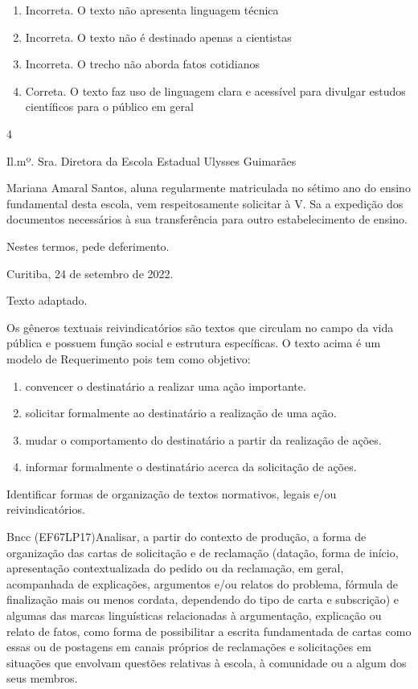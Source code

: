 {{\begin{itemize}
\begin{itemize}
\begin{enumerate}
\def\labelenumi{\arabic{enumi}.}
\item
  Incorreta. O texto não apresenta linguagem técnica
\item
  Incorreta. O texto não é destinado apenas a cientistas
\item
  Incorreta. O trecho não aborda fatos cotidianos
\item
  Correta. O texto faz uso de linguagem clara e acessível para divulgar
  estudos científicos para o público em geral
\end{enumerate}

\num{4}

Il.mº. Sra. Diretora da Escola Estadual Ulysses Guimarães

Mariana Amaral Santos, aluna regularmente matriculada no sétimo ano do
ensino fundamental desta escola, vem respeitosamente solicitar à V. Sa a
expedição dos documentos necessários à sua transferência para outro
estabelecimento de ensino.

Nestes termos, pede deferimento.

Curitiba, 24 de setembro de 2022.

Texto adaptado.

Os gêneros textuais reivindicatórios são textos que circulam no campo da
vida pública e possuem função social e estrutura específicas. O texto
acima é um modelo de Requerimento pois tem como objetivo:

\begin{enumerate}
\def\labelenumi{\arabic{enumi}.}
\item
  convencer o destinatário a realizar uma ação importante.
\item
  solicitar formalmente ao destinatário a realização de uma ação.
\item
  mudar o comportamento do destinatário a partir da realização de ações.
\item
  informar formalmente o destinatário acerca da solicitação de ações.
\end{enumerate}

Identificar formas de organização de textos normativos, legais e/ou
reivindicatórios.

Bncc (EF67LP17)Analisar, a partir do contexto de produção, a forma de
organização das cartas de solicitação e de reclamação (datação, forma de
início, apresentação contextualizada do pedido ou da reclamação, em
geral, acompanhada de explicações, argumentos e/ou relatos do problema,
fórmula de finalização mais ou menos cordata, dependendo do tipo de
carta e subscrição) e algumas das marcas linguísticas relacionadas à
argumentação, explicação ou relato de fatos, como forma de possibilitar
a escrita fundamentada de cartas como essas ou de postagens em canais
próprios de reclamações e solicitações em situações que envolvam
questões relativas à escola, à comunidade ou a algum dos seus membros.


\end{itemize}
\end{itemize}}}
